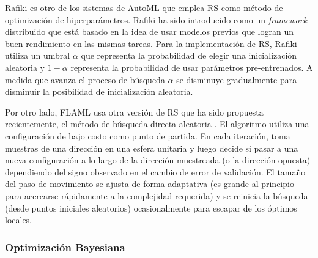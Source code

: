 Rafiki \cite{wang2018rafiki} es otro de los sistemas de AutoML que emplea RS como método de optimización de hiperparámetros. Rafiki ha sido introducido como un \textit{framework} distribuido que está basado en la idea de usar modelos previos que logran un buen rendimiento en las mismas tareas. Para la implementación de RS, Rafiki utiliza un umbral $\alpha$ que representa la probabilidad de elegir una inicialización aleatoria y $1 - \alpha$ representa la probabilidad de usar parámetros pre-entrenados. A medida que avanza el proceso de búsqueda $\alpha$ se disminuye gradualmente para disminuir la posibilidad de inicialización aleatoria.

Por otro lado, FLAML \cite{wang2021flaml} usa otra versión de RS que ha sido propuesta recientemente, el método de búsqueda directa aleatoria \cite{wu2021frugal}. El algoritmo utiliza una configuración de bajo costo como punto de partida. En cada iteración, toma muestras de una dirección en una esfera unitaria y luego decide si pasar a una nueva configuración a lo largo de la dirección muestreada (o la dirección opuesta) dependiendo del signo observado en el cambio de error de validación. El tamaño del paso de movimiento se ajusta de forma adaptativa (es grande al principio para acercarse rápidamente a la complejidad requerida) y se reinicia la búsqueda (desde puntos iniciales aleatorios) ocasionalmente para escapar de los óptimos locales.

\subsubsection{Optimización Bayesiana}



